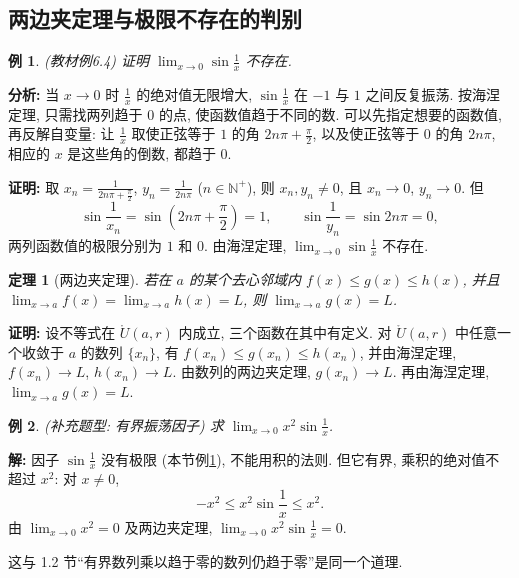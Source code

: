 \documentclass[UTF8,openany]{ctexbook}
\theoremstyle{chinesetextbook}
\newtheorem{example}{例}[section]
\newtheorem{theorem}{定理}[section]
\newenvironment{cnproof}{\par\indent\textbf{证明:} \ignorespaces}{\par}
\newenvironment{cnsolution}{\par\indent\textbf{解:} \ignorespaces}{\par}
\begin{document}
\subsection{两边夹定理与极限不存在的判别}
\begin{example}\label{ex:6-4}
\textnormal{(教材例6.4)} 证明 $\displaystyle\lim_{x\to0}\sin\frac1x$ 不存在.
\end{example}
\par\indent\textbf{分析:} 当 $x\to0$ 时 $\displaystyle\frac1x$ 的绝对值无限增大, $\displaystyle\sin\frac1x$ 在 $-1$ 与 $1$ 之间反复振荡. 按海涅定理, 只需找两列趋于 $0$ 的点, 使函数值趋于不同的数. 可以先指定想要的函数值, 再反解自变量: 让 $\displaystyle\frac1x$ 取使正弦等于 $1$ 的角 $\displaystyle2n\pi+\frac\pi2$, 以及使正弦等于 $0$ 的角 $2n\pi$, 相应的 $x$ 是这些角的倒数, 都趋于 $0$.
\begin{cnproof}
取 $\displaystyle x_n=\frac1{2n\pi+\frac\pi2}$, $\displaystyle y_n=\frac1{2n\pi}$ ($n\in\mathbb N^+$), 则 $x_n,y_n\ne0$, 且 $x_n\to0$, $y_n\to0$. 但
\[
\sin\frac1{x_n}=\sin\left(2n\pi+\frac\pi2\right)=1,\qquad\sin\frac1{y_n}=\sin2n\pi=0,
\]
两列函数值的极限分别为 $1$ 和 $0$. 由海涅定理, $\displaystyle\lim_{x\to0}\sin\frac1x$ 不存在.
\end{cnproof}
\begin{theorem}[两边夹定理]
若在 $a$ 的某个去心邻域内 $f(x)\le g(x)\le h(x)$, 并且 $\displaystyle\lim_{x\to a}f(x)=\lim_{x\to a}h(x)=L$, 则 $\displaystyle\lim_{x\to a}g(x)=L$.
\end{theorem}
\begin{cnproof}
设不等式在 $\mathring U(a,r)$ 内成立, 三个函数在其中有定义. 对 $\mathring U(a,r)$ 中任意一个收敛于 $a$ 的数列 $\{x_n\}$, 有 $f(x_n)\le g(x_n)\le h(x_n)$, 并由海涅定理, $f(x_n)\to L$, $h(x_n)\to L$. 由数列的两边夹定理, $g(x_n)\to L$. 再由海涅定理, $\displaystyle\lim_{x\to a}g(x)=L$.
\end{cnproof}
\begin{example}
\textnormal{(补充题型: 有界振荡因子)} 求 $\displaystyle\lim_{x\to0}x^2\sin\frac1x$.
\end{example}
\begin{cnsolution}
因子 $\displaystyle\sin\frac1x$ 没有极限 (本节例\ref{ex:6-4}), 不能用积的法则. 但它有界, 乘积的绝对值不超过 $x^2$: 对 $x\ne0$,
\[
-x^2\le x^2\sin\frac1x\le x^2.
\]
由 $\displaystyle\lim_{x\to0}x^2=0$ 及两边夹定理, $\displaystyle\lim_{x\to0}x^2\sin\frac1x=0$.
\end{cnsolution}
这与 1.2 节“有界数列乘以趋于零的数列仍趋于零”是同一个道理.
\end{document}
